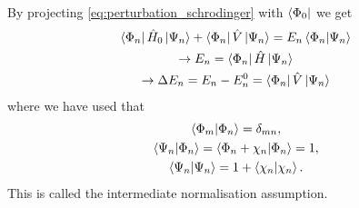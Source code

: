 By projecting \autoref{eq:perturbation_schrodinger} with $\bra{\Phi_0}$ we get
\begin{equation}
    \begin{gathered}
    \bra{\Phi_n} \hat{H}_0 \ket{\Psi_n} + \bra{\Phi_n} \hat{V} \ket{\Psi_n}
        = E_n \braket{\Phi_n}{\Psi_n} \\
    \to E_n = \bra{\Phi_n} \hat{H} \ket{\Psi_n} \\
    \to \Delta E_n = E_n - E_n^{0} = \bra{\Phi_n} \hat{V} \ket{\Psi_n}
    \end{gathered}
\end{equation}
where we have used that 
\begin{gather}
    \label{eq:intermediate_normalisation}
    \braket{\Phi_m}{\Phi_n} = \delta_{mn}, \\
    \braket{\Psi_n}{\Phi_n} = \braket{\Phi_n + \chi_n}{\Phi_n} = 1, \\
    \braket{\Psi_n} = 1 + \braket{\chi_n}.
\end{gather}
This is called the intermediate normalisation assumption.

